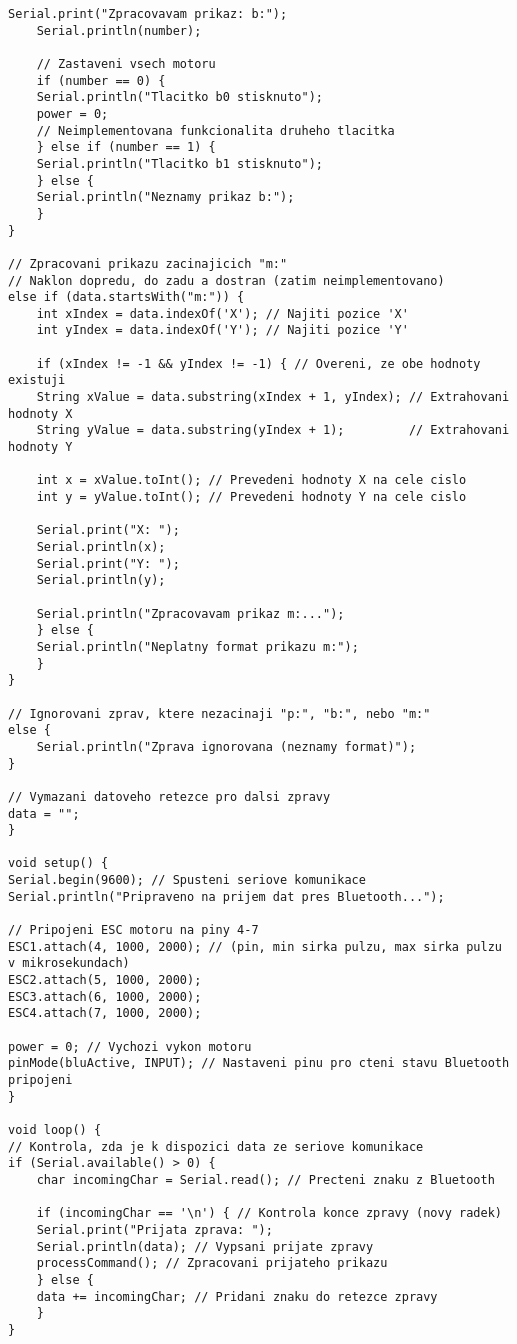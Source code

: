 \documentclass[12pt]{report}
\begin{document}
\begin{appendices}
\begin{lstlisting}[title={}, caption={}, label={}, basicstyle=\footnotesize\ttfamily, inputencoding=utf8]
	Serial.print("Zpracovavam prikaz: b:");
	Serial.println(number);

	// Zastaveni vsech motoru
	if (number == 0) {
	Serial.println("Tlacitko b0 stisknuto");
	power = 0;
	// Neimplementovana funkcionalita druheho tlacitka
	} else if (number == 1) {
	Serial.println("Tlacitko b1 stisknuto");
	} else {
	Serial.println("Neznamy prikaz b:");
	}
}

// Zpracovani prikazu zacinajicich "m:"
// Naklon dopredu, do zadu a dostran (zatim neimplementovano)
else if (data.startsWith("m:")) {
	int xIndex = data.indexOf('X'); // Najiti pozice 'X'
	int yIndex = data.indexOf('Y'); // Najiti pozice 'Y'

	if (xIndex != -1 && yIndex != -1) { // Overeni, ze obe hodnoty existuji
	String xValue = data.substring(xIndex + 1, yIndex); // Extrahovani hodnoty X
	String yValue = data.substring(yIndex + 1);         // Extrahovani hodnoty Y

	int x = xValue.toInt(); // Prevedeni hodnoty X na cele cislo
	int y = yValue.toInt(); // Prevedeni hodnoty Y na cele cislo

	Serial.print("X: ");
	Serial.println(x);
	Serial.print("Y: ");
	Serial.println(y);

	Serial.println("Zpracovavam prikaz m:...");
	} else {
	Serial.println("Neplatny format prikazu m:");
	}
}

// Ignorovani zprav, ktere nezacinaji "p:", "b:", nebo "m:"
else {
	Serial.println("Zprava ignorovana (neznamy format)");
}

// Vymazani datoveho retezce pro dalsi zpravy
data = "";
}

void setup() {
Serial.begin(9600); // Spusteni seriove komunikace
Serial.println("Pripraveno na prijem dat pres Bluetooth...");

// Pripojeni ESC motoru na piny 4-7
ESC1.attach(4, 1000, 2000); // (pin, min sirka pulzu, max sirka pulzu v mikrosekundach)
ESC2.attach(5, 1000, 2000);
ESC3.attach(6, 1000, 2000);
ESC4.attach(7, 1000, 2000);

power = 0; // Vychozi vykon motoru
pinMode(bluActive, INPUT); // Nastaveni pinu pro cteni stavu Bluetooth pripojeni
}

void loop() {
// Kontrola, zda je k dispozici data ze seriove komunikace
if (Serial.available() > 0) {
	char incomingChar = Serial.read(); // Precteni znaku z Bluetooth

	if (incomingChar == '\n') { // Kontrola konce zpravy (novy radek)
	Serial.print("Prijata zprava: ");
	Serial.println(data); // Vypsani prijate zpravy
	processCommand(); // Zpracovani prijateho prikazu
	} else {
	data += incomingChar; // Pridani znaku do retezce zpravy
	}
}


\end{lstlisting}
\end{appendices}
\end{document}
